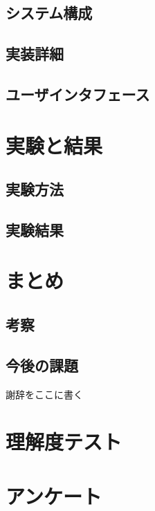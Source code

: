 \documentclass[uplatex,a4paper,12pt]{ujreport}
\begin{document}
\section{システム構成}
\section{実装詳細}
\section{ユーザインタフェース}


\chapter{実験と結果}
\section{実験方法}
\section{実験結果}


\chapter{まとめ}
\section{考察}
\section{今後の課題}

\acknowledgment
謝辞をここに書く




\appendix
\chapter{理解度テスト}
\chapter{アンケート}
\end{document}
